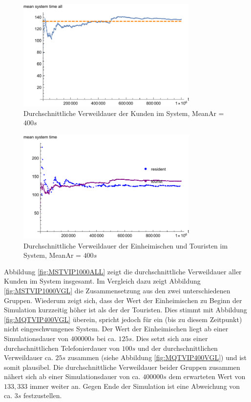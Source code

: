 \begin{figure}[htpb]
	\centering
	\includegraphics[width=0.8\textwidth]{abbildungen/1_Phone_VIP/Arrival_400_Serve_100_dur_1000000_Skip_0/MeanSystemTimeAll.pdf}
	\caption{Durchschnittliche Verweildauer der Kunden im System, MeanAr = $400s$}
	\label{fig:MSTVIP400ALL}
\end{figure}

\begin{figure}[htpb]
	\centering
	\includegraphics[width=0.8\textwidth]{abbildungen/1_Phone_VIP/Arrival_400_Serve_100_dur_1000000_Skip_0/MeanSystemTimeTouristAndResident.pdf}
	\caption{Durchschnittliche Verweildauer der Einheimischen und Touristen im System, MeanAr = $400s$}
	\label{fig:MSTVIP400VGL}
\end{figure}

Abbildung \ref{fig:MSTVIP1000ALL} zeigt die durchschnittliche Verweildauer aller Kunden im System insgesamt. Im Vergleich dazu zeigt Abbildung \ref{fig:MSTVIP1000VGL} die Zusammensetzung aus den zwei unterschiedenen Gruppen. Wiederum zeigt sich, dass der Wert der Einheimischen zu Beginn der Simulation kurzzeitig höher ist als der der Touristen. Dies stimmt mit Abbildung \ref{fig:MQTVIP400VGL} überein, spricht jedoch für ein (bis zu diesem Zeitpunkt) nicht eingeschwungenes System. Der Wert der Einheimischen liegt ab einer Simulationsdauer von $400000s$ bei ca. $125s$. Dies setzt sich aus einer durchschnittlichen Telefonierdauer von $100s$ und der durchschnittlichen Verweildauer ca. $25s$ zusammen (siehe Abbildung \ref{fig:MQTVIP400VGL})  und ist somit plausibel. Die durchschnittliche Verweildauer beider Gruppen zusammen nähert sich ab einer Simulationsdauer von ca. $400000s$ dem erwarteten Wert von $133,333$ immer weiter an. Gegen Ende der Simulation ist eine Abweichung von ca. $3s$ festzustellen.

